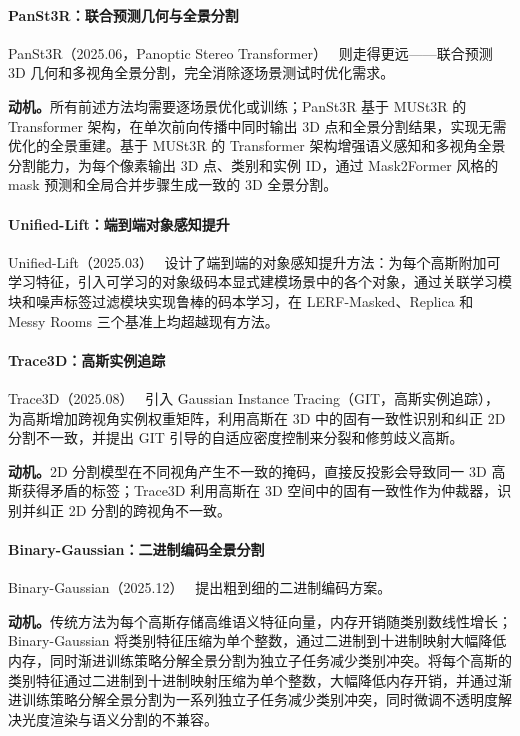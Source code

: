 \paragraph{PanSt3R：联合预测几何与全景分割} PanSt3R（2025.06，Panoptic Stereo Transformer）~\cite{2506_21348} 则走得更远——联合预测 3D 几何和多视角全景分割，完全消除逐场景测试时优化需求。

\textbf{动机。}所有前述方法均需要逐场景优化或训练；PanSt3R 基于 MUSt3R 的 Transformer 架构，在单次前向传播中同时输出 3D 点和全景分割结果，实现无需优化的全景重建。基于 MUSt3R 的 Transformer 架构增强语义感知和多视角全景分割能力，为每个像素输出 3D 点、类别和实例 ID，通过 Mask2Former 风格的 mask 预测和全局合并步骤生成一致的 3D 全景分割。

\paragraph{Unified-Lift：端到端对象感知提升} Unified-Lift（2025.03）~\cite{2503_14029} 设计了端到端的对象感知提升方法：为每个高斯附加可学习特征，引入可学习的对象级码本显式建模场景中的各个对象，通过关联学习模块和噪声标签过滤模块实现鲁棒的码本学习，在 LERF-Masked、Replica 和 Messy Rooms 三个基准上均超越现有方法。

\paragraph{Trace3D：高斯实例追踪} Trace3D（2025.08）~\cite{2508_03227} 引入 Gaussian Instance Tracing（GIT，高斯实例追踪），为高斯增加跨视角实例权重矩阵，利用高斯在 3D 中的固有一致性识别和纠正 2D 分割不一致，并提出 GIT 引导的自适应密度控制来分裂和修剪歧义高斯。

\textbf{动机。}2D 分割模型在不同视角产生不一致的掩码，直接反投影会导致同一 3D 高斯获得矛盾的标签；Trace3D 利用高斯在 3D 空间中的固有一致性作为仲裁器，识别并纠正 2D 分割的跨视角不一致。

\paragraph{Binary-Gaussian：二进制编码全景分割} Binary-Gaussian（2025.12）~\cite{2512_00944} 提出粗到细的二进制编码方案。

\textbf{动机。}传统方法为每个高斯存储高维语义特征向量，内存开销随类别数线性增长；Binary-Gaussian 将类别特征压缩为单个整数，通过二进制到十进制映射大幅降低内存，同时渐进训练策略分解全景分割为独立子任务减少类别冲突。将每个高斯的类别特征通过二进制到十进制映射压缩为单个整数，大幅降低内存开销，并通过渐进训练策略分解全景分割为一系列独立子任务减少类别冲突，同时微调不透明度解决光度渲染与语义分割的不兼容。

